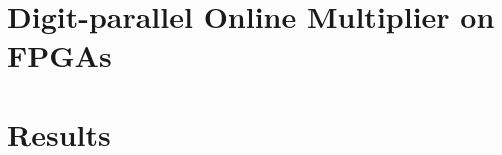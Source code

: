 \documentclass[conference]{IEEEtran}
\begin{document}
\section{Digit-parallel Online Multiplier on FPGAs}


\section{Results}





%
%


%
\end{document}
